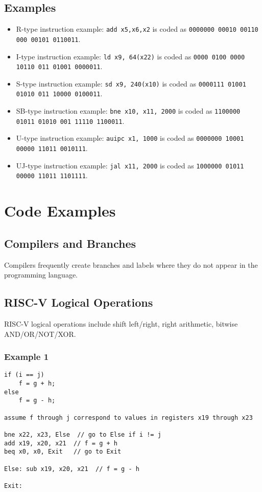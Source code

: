 \documentclass{article}
\begin{document}
\subsection*{Examples}
\begin{itemize}
    \item R-type instruction example: \texttt{add x5,x6,x2} is coded as \texttt{0000000 00010 00110 000 00101 0110011}.
    \item I-type instruction example: \texttt{ld x9, 64(x22)} is coded as \texttt{0000 0100 0000 10110 011 01001 0000011}.
    \item S-type instruction example: \texttt{sd x9, 240(x10)} is coded as \texttt{0000111 01001 01010 011 10000 0100011}.
    \item SB-type instruction example: \texttt{bne x10, x11, 2000} is coded as \texttt{1100000 01011 01010 001 11110 1100011}.
    \item U-type instruction example: \texttt{auipc x1, 1000} is coded as \texttt{0000000 10001 00000 11011 0010111}.
    \item UJ-type instruction example: \texttt{jal x11, 2000} is coded as \texttt{1000000 01011 00000 11011 1101111}.
\end{itemize}

\section*{Code Examples}

\subsection*{Compilers and Branches}
Compilers frequently create branches and labels where they do not appear in the programming language.

\subsection*{RISC-V Logical Operations}
RISC-V logical operations include shift left/right, right arithmetic, bitwise AND/OR/NOT/XOR.

\subsubsection{Example 1}
\begin{verbatim}
if (i == j)
    f = g + h;
else
    f = g - h;

assume f through j correspond to values in registers x19 through x23

bne x22, x23, Else  // go to Else if i != j
add x19, x20, x21  // f = g + h
beq x0, x0, Exit   // go to Exit

Else: sub x19, x20, x21  // f = g - h

Exit:
\end{verbatim}
\end{document}
